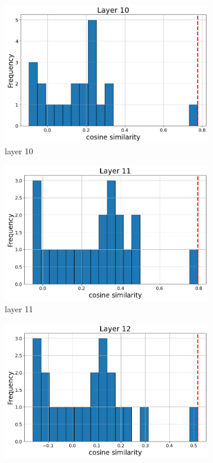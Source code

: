 \documentclass[11pt]{article}
\begin{document}
\begin{figure}[t]
    \begin{subfigure}[t]{0.24\textwidth}
    \centering
    \includegraphics[width=1.4\columnwidth]{figures/obs2_appendix/obs2_layer10.png}
    \caption{layer 10}
  \end{subfigure}\hfill
    \begin{subfigure}[t]{0.24\textwidth}
    \centering
    \includegraphics[width=1.4\columnwidth]{figures/obs2_appendix/obs2_layer11.png}
    \caption{layer 11}
  \end{subfigure}\hfill
  \begin{subfigure}[t]{0.24\textwidth}
    \centering
    \includegraphics[width=1.4\columnwidth]{figures/obs2_appendix/obs2_layer12.png}

\end{subfigure}
\end{figure}
\end{document}
